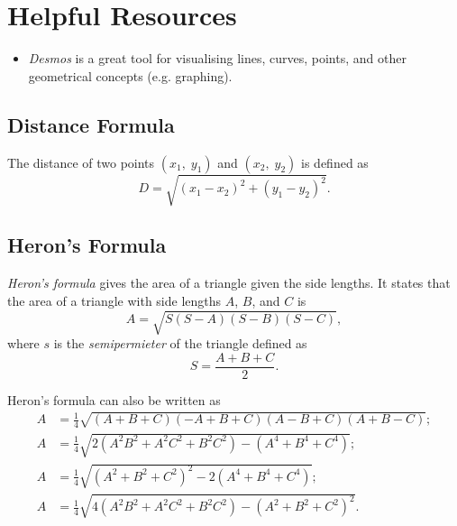 \pushnewpage

\section*{Helpful Resources}
\begin{itemize}
    \item \textit{Desmos} is a great tool for visualising lines, curves, points, and other geometrical concepts (e.g. graphing). 
\end{itemize}

\subsection*{Distance Formula}
The distance of two points $(x_1,\;y_1)$ and $(x_2,\;y_2)$ is defined as
\begin{equation*}
    D=\sqrt{(x_1-x_2)^2+(y_1-y_2)^2}.
\end{equation*}

\subsection*{Heron's Formula}
\textit{Heron's formula} gives the area of a triangle given the side lengths. It states that the area of a triangle with side lengths $A$, $B$, and $C$ is
\begin{equation*}
    A=\sqrt{S(S-A)(S-B)(S-C)},
\end{equation*}
where $s$ is the \textit{semipermieter} of the triangle defined as
\begin{equation*}
    S=\frac{A+B+C}{2}.
\end{equation*}

Heron's formula can also be written as
\begin{equation*}
    \begin{split}
        A &= \frac{1}{4}\sqrt{(A+B+C)(-A+B+C)(A-B+C)(A+B-C)};\\
        A &= \frac{1}{4}\sqrt{2(A^2B^2+A^2C^2+B^2C^2)-(A^4+B^4+C^4)};\\
        A &= \frac{1}{4}\sqrt{(A^2+B^2+C^2)^2-2(A^4+B^4+C^4)};\\
        A &= \frac{1}{4}\sqrt{4(A^2B^2+A^2C^2+B^2C^2)-(A^2+B^2+C^2)^2}.
    \end{split}
\end{equation*}

